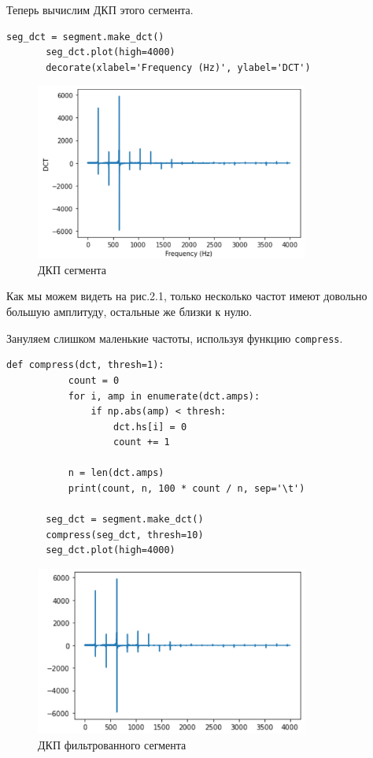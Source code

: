 \documentclass[a4paper,12pt]{report}
\begin{document}
    Теперь вычислим ДКП этого сегмента.
\begin{lstlisting}[caption=Приминение ДКП к сегменту]
       seg_dct = segment.make_dct()
       seg_dct.plot(high=4000)
       decorate(xlabel='Frequency (Hz)', ylabel='DCT')
\end{lstlisting}
\begin{figure}[H]
        \centering
        \includegraphics[width=0.8\textwidth]{fig2-1.PNG}
        \caption{ДКП сегмента}
        \label{fig:fig2-1}
\end{figure}    
       
    Как мы можем видеть на рис.2.1, только несколько частот имеют довольно большую амплитуду, остальные же близки к нулю.
    
    Зануляем слишком маленькие частоты, используя функцию \texttt{compress}.
\begin{lstlisting}[caption=Удаление неслышимых компонентов]
       def compress(dct, thresh=1):
           count = 0
           for i, amp in enumerate(dct.amps):
               if np.abs(amp) < thresh:
                   dct.hs[i] = 0
                   count += 1
            
           n = len(dct.amps)
           print(count, n, 100 * count / n, sep='\t')
    
       seg_dct = segment.make_dct()
       compress(seg_dct, thresh=10)
       seg_dct.plot(high=4000)
\end{lstlisting}
\begin{figure}[H]
        \centering
        \includegraphics[width=0.8\textwidth]{fig2-2.PNG}
        \caption{ДКП фильтрованного сегмента}
        \label{fig:fig2-2}
\end{figure} 
\end{document}
